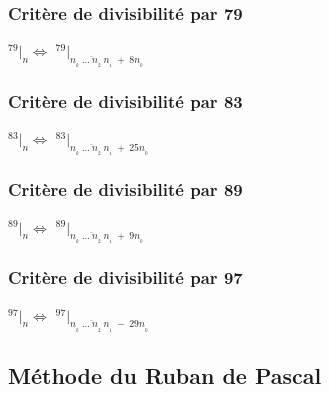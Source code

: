 \documentclass[a4paper]{article}
\begin{document}
\vfill
{\noindent \dotfill}



\subsubsection*{Critère de divisibilité par 79}

\begin{center}
	\huge
	$ ^{79}|_n \Leftrightarrow$ $^{79}|_{\overline{n_{_{k}}~\dots~n_{_2}~n_{_1}}~+~8n_{_0}} $
\end{center}

\bigskip

\pagebreak








\subsubsection*{Critère de divisibilité par 83}

\begin{center}
	\huge
	$ ^{83}|_n \Leftrightarrow$ $^{83}|_{\overline{n_{_{k}}~\dots~n_{_2}~n_{_1}}~+~25n_{_0}} $
\end{center}

\bigskip
{\noindent \dotfill}

\subsubsection*{Critère de divisibilité par 89}

\begin{center}
	\huge
	$ ^{89}|_n \Leftrightarrow$ $^{89}|_{\overline{n_{_{k}}~\dots~n_{_2}~n_{_1}}~+~9n_{_0}} $
\end{center}

\bigskip
{\noindent \dotfill}

\subsubsection*{Critère de divisibilité par 97}

\begin{center}
	\huge
	$ ^{97}|_n \Leftrightarrow$ $^{97}|_{\overline{n_{_{k}}~\dots~n_{_2}~n_{_1}}~-~29n_{_0}} $
\end{center}

\bigskip \bigskip 

\subsection{Méthode du Ruban de Pascal} \label{section_ruban_pascal}
\let\thefootnote\relax{}
\end{document}
